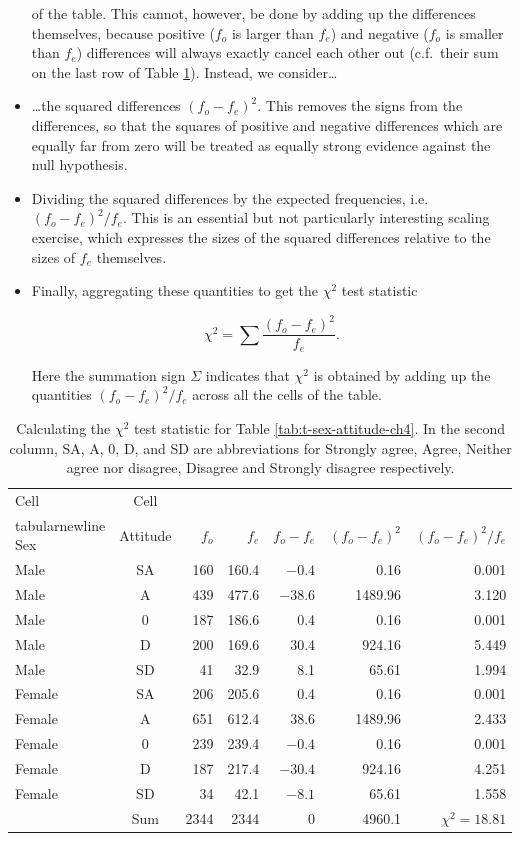 \documentclass[11pt,a4paper,openany]{book}
\begin{document}
\begin{itemize}
  of the table. This cannot, however, be done by adding up the
  differences themselves, because positive (\(f_{o}\) is larger than
  \(f_{e}\)) and negative (\(f_{o}\) is smaller than \(f_{e}\))
  differences will always exactly cancel each other out (c.f.~their sum
  on the last row of Table \ref{tab:t-sex-attitude-chi2}). Instead, we
  consider\ldots{}
\item
  \ldots{}the squared differences \((f_{o}-f_{e})^{2}\). This removes
  the signs from the differences, so that the squares of positive and
  negative differences which are equally far from zero will be treated
  as equally strong evidence against the null hypothesis.
\item
  Dividing the squared differences by the expected frequencies, i.e.
  \((f_{o}-f_{e})^{2}/f_{e}\). This is an essential but not particularly
  interesting scaling exercise, which expresses the sizes of the squared
  differences relative to the sizes of \(f_{e}\) themselves.
\item
  Finally, aggregating these quantities to get the \(\chi^{2}\) test
  statistic

  \begin{equation}\chi^{2} = \sum \frac{(f_{o}-f_{e})^{2}}{f_{e}}.
  \label{eq:chi2}\end{equation}

  Here the summation sign \(\Sigma\) indicates that \(\chi^{2}\) is
  obtained by adding up the quantities \((f_{o}-f_{e})^{2}/f_{e}\)
  across all the cells of the table.
\end{itemize}

\begin{longtable}[]{@{}lcrrrrr@{}}
\caption{\label{tab:t-sex-attitude-chi2} Calculating the \(\chi^{2}\) test
statistic for Table \ref{tab:t-sex-attitude-ch4}. In the second column,
SA, A, 0, D, and SD are abbreviations for Strongly agree, Agree, Neither
agree nor disagree, Disagree and Strongly disagree
respectively.}\tabularnewline
\toprule
Cell & Cell & \ & \ & \ & \ & \\tabularnewline
Sex & Attitude & \(f_{o}\) & \(f_{e}\) & \(f_{o}-f_{e}\) &
\((f_{o}-f_{e})^{2}\) & \((f_{o}-f_{e})^{2}/f_{e}\)\tabularnewline
Male & SA & 160 & 160.4 & \(-0.4\) & 0.16 & 0.001\tabularnewline
Male & A & 439 & 477.6 & \(-38.6\) & 1489.96 & 3.120\tabularnewline
Male & 0 & 187 & 186.6 & 0.4 & 0.16 & 0.001\tabularnewline
Male & D & 200 & 169.6 & 30.4 & 924.16 & 5.449\tabularnewline
Male & SD & 41 & 32.9 & 8.1 & 65.61 & 1.994\tabularnewline
Female & SA & 206 & 205.6 & 0.4 & 0.16 & 0.001\tabularnewline
Female & A & 651 & 612.4 & 38.6 & 1489.96 & 2.433\tabularnewline
Female & 0 & 239 & 239.4 & \(-0.4\) & 0.16 & 0.001\tabularnewline
Female & D & 187 & 217.4 & \(-30.4\) & 924.16 & 4.251\tabularnewline
Female & SD & 34 & 42.1 & \(-8.1\) & 65.61 & 1.558\tabularnewline
& Sum & 2344 & 2344 & 0 & 4960.1 & \(\chi^{2}=18.81\)\tabularnewline
\bottomrule
\end{longtable}
\end{document}
